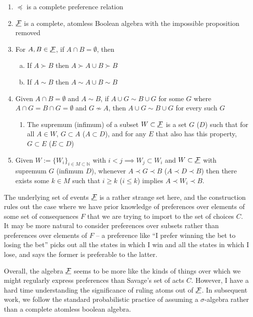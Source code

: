 \begin{enumerate}[A1:]
    \item $\preceq$ is a complete preference relation
    \item $\underline{\mathcal{F}}$ is a complete, atomless Boolean algebra with the impossible proposition removed
    \item For $A,B\in \underline{\mathcal{F}}$, if $A\cap B=\emptyset$, then
    \begin{enumerate}[a)]
        \item If $A\succ B$ then $A\succ A\cup B \succ B$
        \item If $A\sim B$ then $A\sim A\cup B \sim B$
    \end{enumerate}
    \item Given $A\cap B=\emptyset$ and $A\sim B$, if $A\cup G\sim B\cup G$ for some $G$ where $A\cap G=B\cap G=\emptyset$ and $G\not\sim A$, then $A\cup G\sim B\cup G$ for every such $G$
    \begin{enumerate}[D1:]
        \item The supremum (infimum) of a subset $W\subset \underline{\mathcal{F}}$ is a set $G$ ($D$) such that for all $A\in W$, $G\subset A$ ($A\subset D$), and for any $E$ that also has this property, $G\subset E$ ($E\subset D$)
    \end{enumerate}
    \item Given $W:= \{W_i\}_{i\in M\subset \mathbb{N}}$ with $i<j\implies W_j\subset W_i$ and $W\subset \underline{\mathcal{F}}$ with supremum $G$ (infimum $D$), whenever $A\prec G \prec B$ ($A\prec D\prec B$) then there exists some $k\in M$ such that $i\geq k$ ($i\leq k$) implies $A\prec W_i \prec B$.
\end{enumerate}

The underlying set of events $\underline{\mathcal{F}}$ is a rather strange set here, and the construction rules out the case where we have prior knowledge of preferences over elements of some set of consequences $F$ that we are trying to import to the set of choices $C$. It may be more natural to consider preferences over subsets rather than preferences over elements of $F$ -- a preference like ``I prefer winning the bet to losing the bet'' picks out all the states in which I win and all the states in which I lose, and says the former is preferable to the latter. 

Overall, the algebra $\underline{\mathcal{F}}$ seems to be more like the kinds of things over which we might regularly express preferences than Savage's set of acts $C$.  However, I have a hard time understanding the significance of ruling atoms out of $\underline{\mathcal{F}}$. In subsequent work, we follow the standard probabilistic practice of assuming a $\sigma$-algebra rather than a complete atomless boolean algebra.

